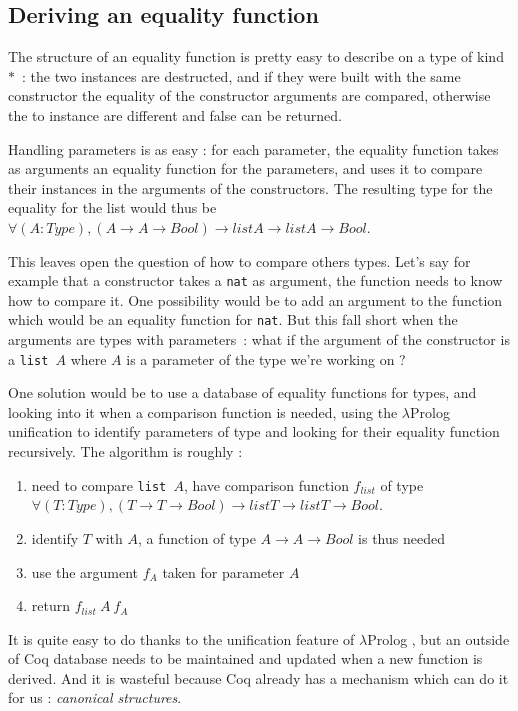 \documentclass{article}
\newcommand{\lprog}{$\lambda$Prolog }
\begin{document}
\subsection{Deriving an equality function}

The structure of an equality function is pretty easy to describe on a type of
kind $*$~: the two instances are destructed, and if they were built with
the same constructor the equality of the constructor arguments are compared,
otherwise the to instance are different and false can be returned.

Handling parameters is as easy : for each parameter, the equality function
takes as arguments an equality function for the parameters, and uses it to
compare their instances in the arguments of the constructors. The resulting
type for the equality for the list would thus be
$\forall (A : Type), (A \rightarrow A \rightarrow Bool) \rightarrow
list A \rightarrow list A \rightarrow Bool$.

This leaves open the question of how to compare others types. Let's say for
example that a constructor takes a \texttt{nat} as argument, the function needs
to know how to compare it. One possibility would be to add an argument to the
function which would be an equality function for \texttt{nat}. But this fall
short when the arguments are types with parameters~: what if the argument of
the constructor is a \texttt{list $A$} where $A$ is a parameter of the type
we're working on ?

One solution would be to use a database of equality functions for types, and
looking into it when a comparison function is needed, using the \lprog
unification to identify parameters of type and looking for their equality function
recursively. The algorithm is roughly :\begin{enumerate}
    \item need to compare \texttt{list $A$}, have comparison function $f_{list}$ of type
        $\forall (T : Type), (T \rightarrow T \rightarrow Bool) \rightarrow
        list T \rightarrow list T \rightarrow Bool$.
    \item identify $T$ with $A$, a function of type $A \rightarrow A \rightarrow Bool$
        is thus needed
    \item use the argument $f_A$ taken for parameter $A$
    \item return $f_{list}\ A\ f_A$
\end{enumerate}

It is quite easy to do thanks to the unification feature of \lprog,
but an outside of Coq database needs to be maintained and updated when a new
function is derived. And it is wasteful because Coq already has a mechanism
which can do it for us : \emph{canonical structures}.
\end{document}

